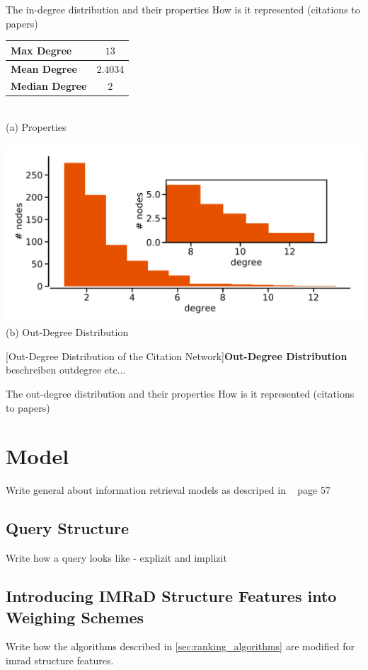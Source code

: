 The in-degree distribution and their properties How is it represented (citations to papers)

\begin{minipage}[!t]{\textwidth}
  \begin{minipage}[b]{0.39\textwidth}
    \centering
    \begin{tabular}{ l c }
      \toprule
      \textbf{Max Degree}    & $13$     \\ \midrule
      \textbf{Mean Degree}   & $2.4034$ \\ \midrule
      \textbf{Median Degree} & $2$      \\
      \bottomrule
  \end{tabular} \\
  \vspace*{1cm}
  (a) Properties
\end{minipage}
\begin{minipage}[b]{0.59\textwidth}
  \centering
  \includegraphics[width=1.0\textwidth]{figures/out-degree_distribution} \\
  (b) Out-Degree Distribution
  \end{minipage}
  [Out-Degree Distribution of the Citation Network]{\textbf{Out-Degree Distribution} beschreiben outdegree etc...}
  \label{fig:indegree_distribution}
\end{minipage}

The out-degree distribution and their properties How is it represented (citations to papers)

\section{Model}
\label{sec:model}

Write general about information retrieval models as descriped in ~\cite{ModernInvormationRetrieval1999} page 57

\subsection{Query Structure}

Write how a query looks like - explizit and implizit

\subsection{Introducing IMRaD Structure Features into Weighing Schemes}

Write how the algorithms described in \cref{sec:ranking_algorithms} are modified for imrad structure features.
